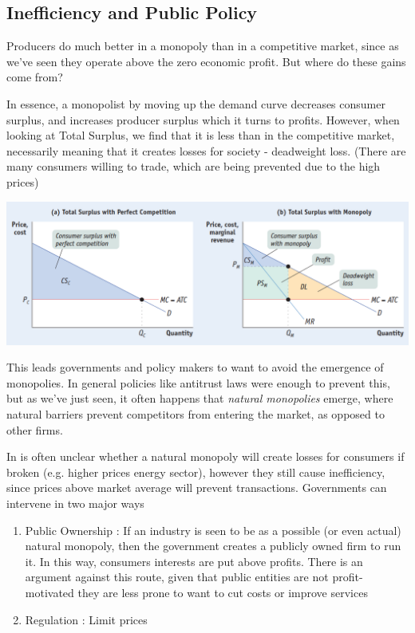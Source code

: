 \documentclass[english,course]{Notes}
\newcommand{\ita}[1]{\textit{#1}}
\begin{document}
\subsection{Inefficiency and Public Policy}

\par{Producers do much better in a monopoly than in a competitive market, since as we've seen they operate above the zero economic profit. But where do these gains come from?}
\par{In essence, a monopolist by moving up the demand curve decreases consumer surplus, and increases producer surplus which it turns to profits. However, when looking at Total Surplus, we find that it is less than in the competitive market, necessarily meaning that it creates losses for society - deadweight loss. (There are many consumers willing to trade, which are being prevented due to the high prices)}

\includegraphics[width=\textwidth]{mon4}

\par{This leads governments and policy makers to want to avoid the emergence of monopolies. In general policies like antitrust laws were enough to prevent this, but as we've just seen, it often happens that \ita{natural monopolies} emerge, where natural barriers prevent competitors from entering the market, as opposed to other firms.}
\par{In is often unclear whether a natural monopoly will create losses for consumers if broken (e.g. higher prices energy sector), however they still cause inefficiency, since prices above market average will prevent transactions. Governments can intervene in two major ways}

\begin{enumerate}
	\item Public Ownership : If an industry is seen to be as a possible (or even actual) natural monopoly, then the government creates a publicly owned firm to run it. In this way, consumers interests are put above profits. There is an argument against this route, given that public entities are not profit-motivated they are less prone to want to cut costs or improve services 
	\item Regulation : Limit prices
\end{enumerate}
\end{document}
